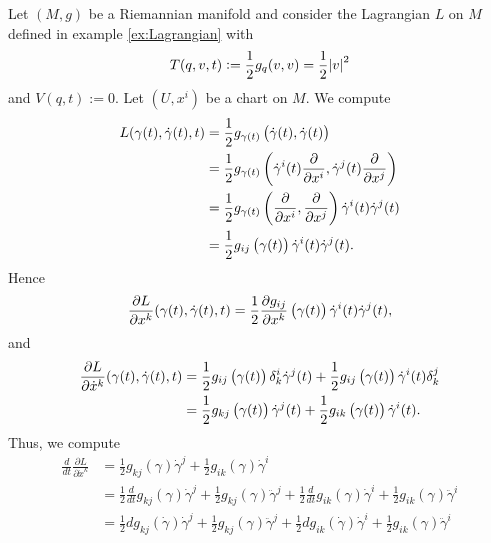 \begin{example}
	Let $(M,g)$ be a Riemannian manifold and consider the Lagrangian $L$ on $M$ defined in example \ref{ex:Lagrangian} with
	\begin{equation*}
		T(q,v,t) := \frac{1}{2}g_q(v,v) = \frac{1}{2}\abs{v}^2
	\end{equation*}
	\noindent and $V(q,t) := 0$. Let $(U,x^i)$ be a chart on $M$. We compute
	\begin{align*}
		L(\gamma(t),\dot{\gamma}(t),t) &= \frac{1}{2}g_{\gamma(t)}\del[1]{\dot{\gamma}(t),\dot{\gamma}(t)}\\
		&= \frac{1}{2}g_{\gamma(t)}\del[3]{\dot{\gamma}^i(t)\frac{\partial}{\partial x^i},\dot{\gamma}^j(t)\frac{\partial}{\partial x^j}}\\
		&= \frac{1}{2}g_{\gamma(t)}\del[3]{\frac{\partial}{\partial x^i},\frac{\partial}{\partial x^j}}\dot{\gamma}^i(t)\dot{\gamma}^j(t)\\
		&= \frac{1}{2}g_{ij}\del[1]{\gamma(t)}\dot{\gamma}^i(t)\dot{\gamma}^j(t).
	\end{align*}
	Hence 
	\begin{equation*}
		\frac{\partial L}{\partial x^k}(\gamma(t),\dot{\gamma}(t),t) = \frac{1}{2}\frac{\partial g_{ij}}{\partial x^k}\del[1]{\gamma(t)}\dot{\gamma}^i(t)\dot{\gamma}^j(t),
	\end{equation*}
	\noindent and
	\begin{align*}
		\frac{\partial L}{\partial \dot{x}^k}(\gamma(t),\dot{\gamma}(t),t) &= \frac{1}{2}g_{ij}\del[1]{\gamma(t)}\delta^i_k\dot{\gamma}^j(t) + \frac{1}{2}g_{ij}\del[1]{\gamma(t)}\dot{\gamma}^i(t)\delta^j_k\\
		&= \frac{1}{2}g_{kj}\del[1]{\gamma(t)}\dot{\gamma}^j(t) + \frac{1}{2}g_{ik}\del[1]{\gamma(t)}\dot{\gamma}^i(t).
	\end{align*}
	Thus, we compute
	\begin{align*}
		\frac{d}{dt}\frac{\partial L}{\partial \dot{x}^k} &= \frac{1}{2}g_{kj}(\gamma)\dot{\gamma}^j + \frac{1}{2}g_{ik}(\gamma)\dot{\gamma}^i\\
		&= \frac{1}{2}\frac{d}{dt}g_{kj}(\gamma)\dot{\gamma}^j + \frac{1}{2}g_{kj}(\gamma)\ddot{\gamma}^j + \frac{1}{2}\frac{d}{dt}g_{ik}(\gamma)\dot{\gamma}^i + \frac{1}{2}g_{ik}(\gamma)\ddot{\gamma}^i\\
		&= \frac{1}{2}dg_{kj}(\dot{\gamma})\dot{\gamma}^j + \frac{1}{2}g_{kj}(\gamma)\ddot{\gamma}^j + \frac{1}{2}dg_{ik}(\dot{\gamma})\dot{\gamma}^i + \frac{1}{2}g_{ik}(\gamma)\ddot{\gamma}^i\\

\end{align*}
\end{example}
